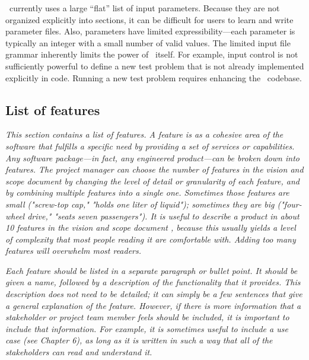 \documentclass[12pt]{article}
\begin{document}
% 
    \enzo\ currently uses a large ``flat'' list of input parameters.
    Because they are not organized explicitly into sections, it can be
    difficult for users to learn and write parameter files.
%
    Also, parameters have limited expressibility---each parameter is
    typically an integer with a small number of valid values.
%
    The limited input file grammar inherently limits the power of
    \enzo\ itself.  For example, input control is not sufficiently
    powerful to define a new test problem that is not already
    implemented explicitly in code.  Running a new test problem
    requires enhancing the \enzo\ codebase.


\subsection{List of features}

    \textit{This section contains a list of features. A feature is as a
    cohesive area of the software that fulfills a specific need by
    providing a set of services or capabilities. Any software
    package---in fact, any engineered product---can be broken down
    into features. The project manager can choose the number of
    features in the vision and scope document by changing the level of
    detail or granularity of each feature, and by combining multiple
    features into a single one. Sometimes those features are small
    ("screw-top cap," "holds one liter of liquid"); sometimes they are
    big ("four-wheel drive," "seats seven passengers"). It is useful
    to describe a product in about 10 features in the vision and scope
    document , because this usually yields a level of complexity that
    most people reading it are comfortable with. Adding too many
    features will overwhelm most readers.}

    \textit{Each feature should be listed in a separate paragraph or bullet
    point. It should be given a name, followed by a description of the
    functionality that it provides. This description does not need to
    be detailed; it can simply be a few sentences that give a general
    explanation of the feature. However, if there is more information
    that a stakeholder or project team member feels should be
    included, it is important to include that information. For
    example, it is sometimes useful to include a use case (see Chapter
    6), as long as it is written in such a way that all of the
    stakeholders can read and understand it.}
\end{document}
